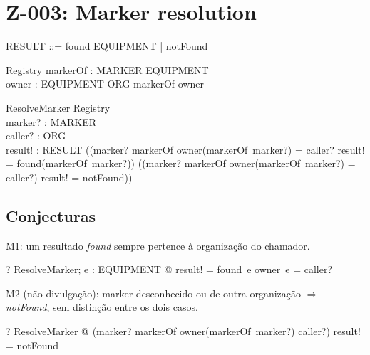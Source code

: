 \documentclass{article}
\begin{document}
\section*{Z-003: Marker resolution}

\begin{zed}
\end{zed}

\begin{zed}
  RESULT ::= found \ldata EQUIPMENT \rdata | notFound
\end{zed}

\begin{schema}{Registry}
  markerOf : MARKER \pinj EQUIPMENT \\
  owner : EQUIPMENT \pfun ORG
\where
  \ran markerOf \subseteq \dom owner
\end{schema}

\begin{schema}{ResolveMarker}
  \Xi Registry \\
  marker? : MARKER \\
  caller? : ORG \\
  result! : RESULT
\where
  ((marker? \in \dom markerOf \land owner(markerOf~marker?) = caller?
     \land result! = found(markerOf~marker?))
  \lor
  (\lnot (marker? \in \dom markerOf \land owner(markerOf~marker?) = caller?)
     \land result! = notFound))
\end{schema}

\subsection*{Conjecturas}

M1: um resultado \emph{found} sempre pertence à organização do chamador.

\begin{zed}
  \vdash? \forall ResolveMarker; e : EQUIPMENT @
    result! = found~e \implies owner~e = caller?
\end{zed}

M2 (não-divulgação): marker desconhecido ou de outra organização $\Rightarrow$ \emph{notFound},
sem distinção entre os dois casos.

\begin{zed}
  \vdash? \forall ResolveMarker @
    (marker? \notin \dom markerOf \lor owner(markerOf~marker?) \neq caller?)
    \implies result! = notFound
\end{zed}

\end{document}

